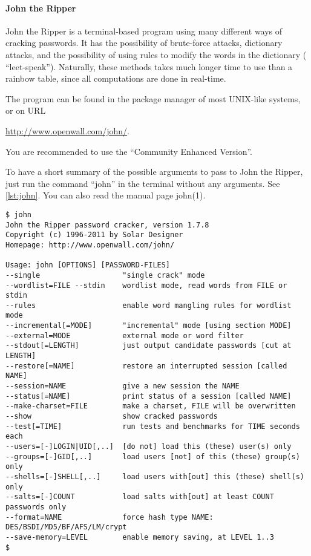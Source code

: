 \paragraph{John the Ripper}

John the Ripper is a terminal-based program using many different ways of 
cracking passwords.
It has the possibility of brute-force attacks, dictionary attacks, and the 
possibility of using rules to modify the words in the dictionary (\eg 
\enquote{leet-speak}).
Naturally, these methods takes much longer time to use than a rainbow table, 
since all computations are done in real-time.

The program can be found in the package manager of most UNIX-like systems, or 
on URL
\begin{center}
  \url{http://www.openwall.com/john/}.
\end{center}
You are recommended to use the \enquote{Community Enhanced Version}.

To have a short summary of the possible arguments to pass to John the Ripper, 
just run the command \enquote{john} in the terminal without any arguments.
See \cref{lst:john}.
You can also read the manual page john(1).

\begin{lstlisting}[float,caption={Output from John the Ripper in the 
terminal.},label={lst:john},breaklines=false]
$ john
John the Ripper password cracker, version 1.7.8
Copyright (c) 1996-2011 by Solar Designer
Homepage: http://www.openwall.com/john/

Usage: john [OPTIONS] [PASSWORD-FILES]
--single                   "single crack" mode
--wordlist=FILE --stdin    wordlist mode, read words from FILE or stdin
--rules                    enable word mangling rules for wordlist mode
--incremental[=MODE]       "incremental" mode [using section MODE]
--external=MODE            external mode or word filter
--stdout[=LENGTH]          just output candidate passwords [cut at LENGTH]
--restore[=NAME]           restore an interrupted session [called NAME]
--session=NAME             give a new session the NAME
--status[=NAME]            print status of a session [called NAME]
--make-charset=FILE        make a charset, FILE will be overwritten
--show                     show cracked passwords
--test[=TIME]              run tests and benchmarks for TIME seconds each
--users=[-]LOGIN|UID[,..]  [do not] load this (these) user(s) only
--groups=[-]GID[,..]       load users [not] of this (these) group(s) only
--shells=[-]SHELL[,..]     load users with[out] this (these) shell(s) only
--salts=[-]COUNT           load salts with[out] at least COUNT passwords only
--format=NAME              force hash type NAME: DES/BSDI/MD5/BF/AFS/LM/crypt
--save-memory=LEVEL        enable memory saving, at LEVEL 1..3
$
\end{lstlisting}

